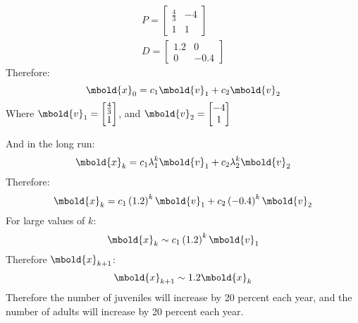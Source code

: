 \documentclass[12pt letter]{report}
\begin{document}
{\begin{enumerate}
          \begin{align*}
            P = \begin{bmatrix} \frac{4}{3} &-4 \\ 1 & 1 \end{bmatrix} \\
            D = \begin{bmatrix} 1.2 & 0 \\ 0 & -0.4 \end{bmatrix}
          \end{align*}
          Therefore:
          \[
            \mbold{x}_0 = c_1 \mbold{v}_1 + c_2 \mbold{v}_2
          \]
          Where $\mbold{v}_1 = \begin{bmatrix} \frac{4}{3} \\ 1 \end{bmatrix} $, and $\mbold{v}_2 = \begin{bmatrix} -4
              \\ 1\end{bmatrix} $

          \noindent And in the long run:
          \[
            \mbold{x}_k = c_1 \lambda_1^{k} \mbold{v}_1 + c_2 \lambda_2^{k}\mbold{v}_2
          \]
          Therefore:
          \[
            \mbold{x}_k = c_1 \left( 1.2 \right)^{k}\mbold{v}_1 + c_2 \left( -0.4 \right) ^{k} \mbold{v}_2
          \]
          For large values of $k$:
          \[
            \mbold{x}_k \sim c_1 \left( 1.2 \right)^{k} \mbold{v}_1
          \]
          Therefore $\mbold{x}_{k+1}$:
          \[
            \mbold{x}_{k+1} \sim 1.2 \mbold{x}_k
          \]
          Therefore the number of juveniles will increase by 20 percent each year, and the number of adults will increase by 20 percent each year.


  \end{enumerate}


}
\end{document}
